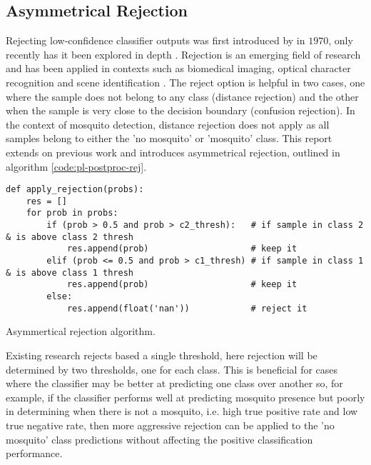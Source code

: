     \subsection{Asymmetrical Rejection}
    \label{subsec:pl-postproc-rej}
        Rejecting low-confidence classifier outputs was first introduced by \textcite{Chow1970} in $1970$, only recently has it been explored in depth \cite{SajjadAhmedNadeem,Condessa2017}. Rejection is an emerging field of research and has been applied in contexts such as biomedical imaging, optical character recognition and scene identification \cite{Condessa2017}. The reject option is helpful in two cases, one where the sample does not belong to any class (distance rejection) and the other when the sample is very close to the decision boundary (confusion rejection). In the context of mosquito detection, distance rejection does not apply as all samples belong to either the 'no mosquito' or 'mosquito' class. This report extends on previous work and introduces asymmetrical rejection, outlined in algorithm \ref{code:pl-postproc-rej}.
        \begin{listing}[ht]
            \begin{verbatim}
def apply_rejection(probs):
    res = []
    for prob in probs:
        if (prob > 0.5 and prob > c2_thresh):   # if sample in class 2 & is above class 2 thresh
            res.append(prob)                    # keep it
        elif (prob <= 0.5 and prob > c1_thresh) # if sample in class 1 & is above class 1 thresh
            res.append(prob)                    # keep it
        else:
            res.append(float('nan'))            # reject it
            \end{verbatim}
            \caption{Asymmertical rejection algorithm.}
            \label{code:pl-postproc-rej}
        \end{listing} 
        Existing research rejects based a single threshold, here rejection will be determined by two thresholds, one for each class. This is beneficial for cases where the classifier may be better at predicting one class over another so, for example, if the classifier performs well at predicting mosquito presence but poorly in determining when there is not a mosquito, i.e. high true positive rate and low true negative rate, then more aggressive rejection can be applied to the 'no mosquito' class predictions without affecting the positive classification performance.
        
